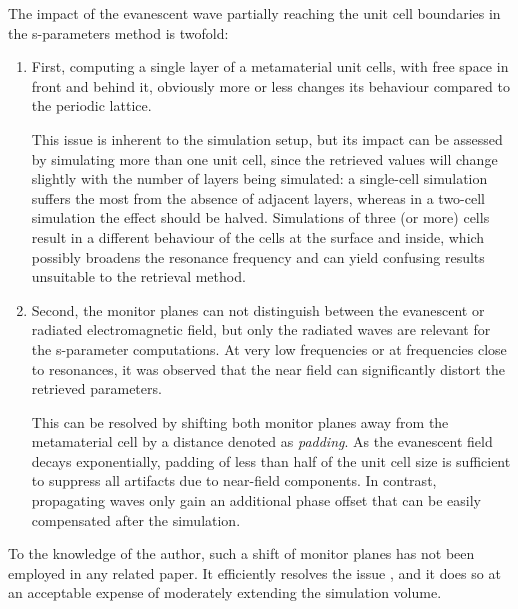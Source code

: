 The impact of the evanescent wave partially reaching the unit cell boundaries in the s-parameters method is twofold:
\begin{enumerate}
 \item{First, computing a single layer of a metamaterial unit cells, with free space in front and behind it, obviously more or less changes its behaviour compared to the periodic lattice. 

This issue is inherent to the simulation setup, but its impact can be assessed by simulating more than one unit cell, since the retrieved values will change slightly with the number of layers being simulated: a single-cell simulation suffers the most from the absence of adjacent layers, whereas in a two-cell simulation the effect should be halved. Simulations of three (or more) cells result in a different behaviour of the cells at the surface and inside, which possibly broadens the resonance frequency and can yield confusing results unsuitable to the retrieval method.
 } 
 \item{Second, the monitor planes can not distinguish between the evanescent or radiated electromagnetic field, but only the radiated waves are relevant for the s-parameter computations. At very low frequencies or at frequencies close to resonances, it was observed that the near field can significantly distort the retrieved parameters.

This can be resolved by shifting both monitor planes away from the metamaterial cell by a distance denoted as \textit{padding}. As the evanescent field decays exponentially, padding of less than half of the unit cell size is sufficient to suppress all artifacts due to near-field components. In contrast, propagating waves only gain an additional phase offset that can be easily compensated after the simulation. } 
 \end{enumerate}
To the knowledge of the author, such a shift of monitor planes has not been employed in any related paper. It efficiently resolves the issue , and it does so at an acceptable expense of moderately extending the simulation volume. %

